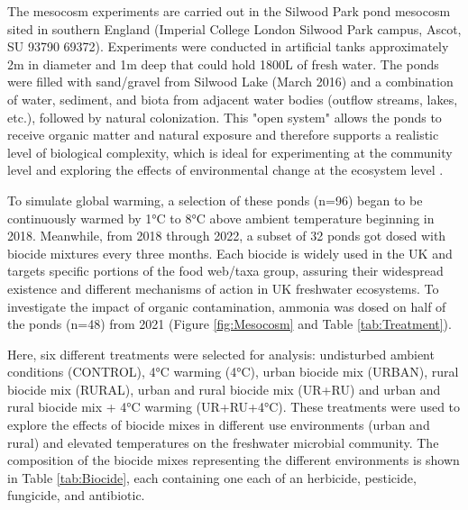 \documentclass[11pt, a4paper]{article}
\begin{document}
\begin{spacing}{1.5}
The mesocosm experiments are carried out in the Silwood Park pond mesocosm sited in southern England (Imperial College London Silwood Park campus, Ascot, SU 93790 69372). Experiments were conducted in artificial tanks approximately 2m in diameter and 1m deep that could hold 1800L of fresh water. The ponds were filled with sand/gravel from Silwood Lake (March 2016) and a combination of water, sediment, and biota from adjacent water bodies (outflow streams, lakes, etc.), followed by natural colonization. This "open system" allows the ponds to receive organic matter and natural exposure and therefore supports a realistic level of biological complexity, which is ideal for experimenting at the community level and exploring the effects of environmental change at the ecosystem level \citep{stewart2013mesocosm}.  

To simulate global warming, a selection of these ponds (n=96) began to be continuously warmed by 1°C to 8°C above ambient temperature beginning in 2018. Meanwhile, from 2018 through 2022, a subset of 32 ponds got dosed with biocide mixtures every three months. Each biocide is widely used in the UK and targets specific portions of the food web/taxa group, assuring their widespread existence and different mechanisms of action in UK freshwater ecosystems. To investigate the impact of organic contamination, ammonia was dosed on half of the ponds (n=48) from 2021 (Figure \ref{fig:Mesocosm} and Table \ref{tab:Treatment}).

Here, six different treatments were selected for analysis: undisturbed ambient conditions (CONTROL), 4°C warming (4°C), urban biocide mix (URBAN), rural biocide mix (RURAL), urban and rural biocide mix (UR+RU) and urban and rural biocide mix + 4°C warming (UR+RU+4°C). These treatments were used to explore the effects of biocide mixes in different use environments (urban and rural) and elevated temperatures on the freshwater microbial community. The composition of the biocide mixes representing the different environments is shown in Table \ref{tab:Biocide}, each containing one each of an herbicide, pesticide, fungicide, and antibiotic.


\end{spacing}
\end{document}
